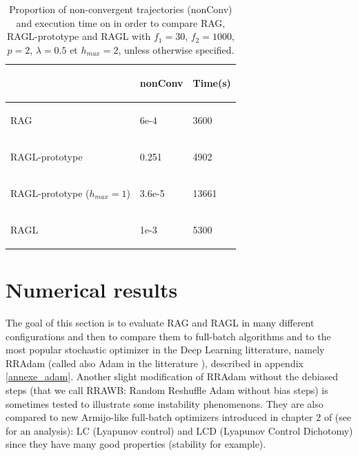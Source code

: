 \begin{table}[h!]
	\centering
	\caption{Proportion of non-convergent trajectories (nonConv) and execution time on \polyFive in order to compare RAG, RAGL-prototype and RAGL with $f_1=30$, $f_2=1000$, $p=2$, $\lambda=0.5$ et $h_{max}=2$, unless otherwise specified.}
	\begin{tabular}{lll}
		\toprule
		\begin{bf} \diagbox{Algos}{} \end{bf} & \begin{bf}nonConv\end{bf} & \begin{bf}Time(s)\end{bf} \\
		\midrule
		\begin{bf}RAG\end{bf} & 6e-4 & 3600 \\ \midrule
		\begin{bf}RAGL-prototype\end{bf} & 0.251 & 4902 \\ \midrule
		\begin{bf}RAGL-prototype ($h_{max}=1$)\end{bf} & 3.6e-5 & 13661 \\ \midrule
		\begin{bf}RAGL\end{bf} & 1e-3 & 5300 \\ \bottomrule
	\end{tabular}
	\label{polyFive_ecreme}
\end{table} 


\section{Numerical results}
\label{section_results}

The goal of this section is to evaluate RAG and RAGL in many different configurations and then to compare them to full-batch algorithms and to the most popular stochastic optimizer
in the Deep Learning litterature, namely RRAdam (called also Adam in the litterature \cite{Adam}), described in appendix \ref{annexe_adam}. Another slight modification of RRAdam without the debiased steps (that we call RRAWB: Random Reshuffle Adam without bias steps) is sometimes tested to illustrate some instability phenomenons. They are also compared to new Armijo-like full-batch optimizers introduced in chapter 2 of \cite{Bilel_thesis} (see \cite{Lyap_Theory_Bilel} for an analysis): LC (Lyapunov control) and LCD (Lyapunov Control Dichotomy) since they have many good properties (stability for example).

